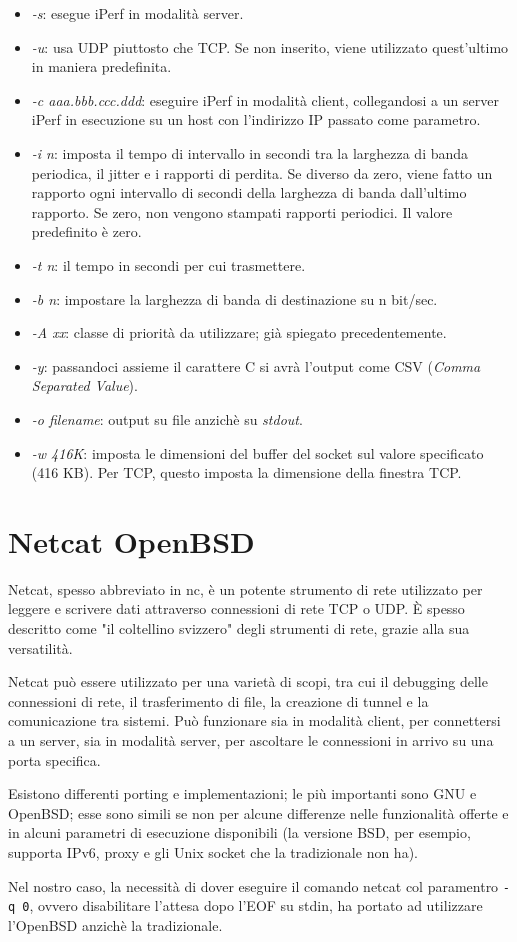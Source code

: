 \begin{itemize}
    \item \textit{-s}: esegue iPerf in modalità server.
    \item \textit{-u}: usa UDP piuttosto che TCP. Se non inserito, viene utilizzato quest'ultimo in maniera predefinita.
    \item \textit{-c aaa.bbb.ccc.ddd}: eseguire iPerf in modalità client, collegandosi a un server iPerf in esecuzione su un host con l'indirizzo IP passato come parametro.
    \item \textit{-i n}: imposta il tempo di intervallo in secondi tra la larghezza di banda periodica, il jitter e i rapporti di perdita. Se diverso da zero, viene fatto un rapporto ogni intervallo di secondi della larghezza di banda dall'ultimo rapporto. Se zero, non vengono stampati rapporti periodici. Il valore predefinito è zero.
    \item \textit{-t n}: il tempo in secondi per cui trasmettere.
    \item \textit{-b n}: impostare la larghezza di banda di destinazione su n bit/sec.
    \item \textit{-A xx}: classe di priorità da utilizzare; già spiegato precedentemente.
    \item \textit{-y}: passandoci assieme il carattere C si avrà l'output come CSV (\textit{Comma Separated Value}).
    \item \textit{-o filename}: output su file anzichè su \textit{stdout}.
    \item \textit{-w 416K}: imposta le dimensioni del buffer del socket sul valore specificato (416 KB). Per TCP, questo imposta la dimensione della finestra TCP.
\end{itemize}

\section{Netcat OpenBSD}
Netcat, spesso abbreviato in nc, è un potente strumento di rete utilizzato per leggere e scrivere dati attraverso connessioni di rete TCP o UDP. È spesso descritto come "il coltellino svizzero" degli strumenti di rete, grazie alla sua versatilità.

Netcat può essere utilizzato per una varietà di scopi, tra cui il debugging delle connessioni di rete, il trasferimento di file, la creazione di tunnel e la comunicazione tra sistemi. Può funzionare sia in modalità client, per connettersi a un server, sia in modalità server, per ascoltare le connessioni in arrivo su una porta specifica.

Esistono differenti porting e implementazioni; le più importanti sono GNU e OpenBSD; esse sono simili se non per alcune differenze nelle funzionalità offerte e in alcuni parametri di esecuzione disponibili (la versione BSD, per esempio, supporta IPv6, proxy e gli Unix socket che la tradizionale non ha). 

Nel nostro caso, la necessità di dover eseguire il comando netcat col paramentro \verb|-q 0|, ovvero disabilitare l'attesa dopo l'EOF su stdin, ha portato ad utilizzare l'OpenBSD anzichè la tradizionale.
